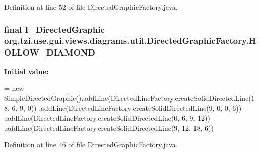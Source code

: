 Definition at line 52 of file Directed\-Graphic\-Factory.\-java.

\hypertarget{classorg_1_1tzi_1_1use_1_1gui_1_1views_1_1diagrams_1_1util_1_1_directed_graphic_factory_a0881f95044b84bd97ccac1b4586fd328}{
\subsubsection[{H\-O\-L\-L\-O\-W\-\_\-\-D\-I\-A\-M\-O\-N\-D}]{\setlength{\rightskip}{0pt plus 5cm}final {\bf I\-\_\-\-Directed\-Graphic} org.\-tzi.\-use.\-gui.\-views.\-diagrams.\-util.\-Directed\-Graphic\-Factory.\-H\-O\-L\-L\-O\-W\-\_\-\-D\-I\-A\-M\-O\-N\-D\hspace{0.3cm}{\ttfamily [static]}}}\label{classorg_1_1tzi_1_1use_1_1gui_1_1views_1_1diagrams_1_1util_1_1_directed_graphic_factory_a0881f95044b84bd97ccac1b4586fd328}
{\bfseries Initial value\-:}
\begin{DoxyCode}
=
            \textcolor{keyword}{new} SimpleDirectedGraphic().addLine(DirectedLineFactory.createSolidDirectedLine(18, 6, 9, 0))
            .addLine(DirectedLineFactory.createSolidDirectedLine(9, 0, 0, 6))
            .addLine(DirectedLineFactory.createSolidDirectedLine(0, 6, 9, 12))
            .addLine(DirectedLineFactory.createSolidDirectedLine(9, 12, 18, 6))
\end{DoxyCode}


Definition at line 46 of file Directed\-Graphic\-Factory.\-java.

